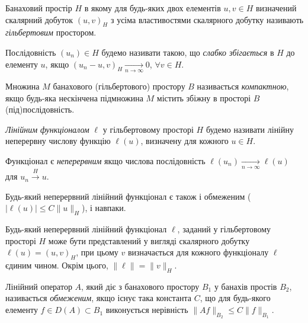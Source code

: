 \begin{definition}
    Банаховий простір $H$ в якому для будь-яких двох елементів $u, v \in H$ визначений скалярний добуток $(u, v)_H$ з усіма властивостями скалярного добутку називають \emph{гільбертовим} простором.
\end{definition}

\begin{definition}
    Послідовність $(u_n) \in H$ будемо називати такою, що \emph{слабко збігається} в $H$ до елементу $u$, якщо $(u_n - u, v)_H \xrightarrow[n \to \infty]{} 0$, $\forall v \in H$. 
\end{definition}

\begin{definition}
    Множина $M$ банахового (гільбертового) простору $B$ називається \emph{компактною}, якщо будь-яка нескінчена підмножина $M$ містить збіжну в просторі $B$ (під)послідовність.
\end{definition}

\begin{definition}
    \emph{Лінійним функціоналом} $\ell$ у гільбертовому просторі $H$ будемо називати лінійну неперервну числову функцію $\ell(u)$, визначену для кожного $u \in H$.
\end{definition}

\begin{definition}
    Функціонал є \emph{неперервним} якщо числова послідовність $\ell(u_n) \xrightarrow[n \to \infty]{} \ell(u)$ для $u_n \xrightarrow{H} u$.
\end{definition}

\begin{proposition}
    Будь-який неперервний лінійний функціонал є також і обмеженим ($|\ell(u)| \le C \|u\|_H$), і навпаки.
\end{proposition}

\begin{theorem}
    Будь-який неперервний лінійний функціонал $\ell$, заданий у гільбертовому просторі $H$ може бути представлений у вигляді скалярного добутку $\ell(u) = (u,v)_H$, при цьому $v$ визначається для кожного функціоналу $\ell$ єдиним чином. Окрім цього, $\|\ell\| = \|v\|_H$.
\end{theorem}

\begin{definition}
    Лінійний оператор $A$, який діє з банахового простору $B_1$ у банахів простів $B_2$, називається \emph{обмеженим}, якщо існує така константа $C$, що для будь-якого елементу $f \in D(A) \subset B_1$ виконується нерівність $\|A f\|_{B_2} \le C \|f\|_{B_1}$.
\end{definition}

